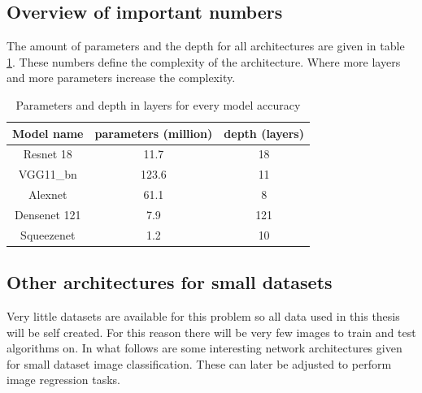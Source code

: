 	\subsection{Overview of important numbers}
	\label{sec:lit:va:overview}
The amount of parameters and the depth for all architectures are given in table \ref{tab:lit:ov:paramdepth}. These numbers define the complexity of the architecture. Where more layers and more parameters increase the complexity.
	\begin{table}[!ht]
	\centering
	\caption{Parameters and depth in layers for every model accuracy}
\begin{tabular}{c | c c}
			Model name		& parameters (million) 		& depth (layers) \\ \hline
			Resnet 18			&	11.7 			&	18 				\\
			VGG11\_bn			&	123.6 			& 11					\\
			Alexnet				&	61.1 			& 8					\\
			Densenet 121	&	7.9 			& 121				\\
			Squeezenet		&	1.2 			& 10
\end{tabular}
\centering

\label{tab:lit:ov:paramdepth}
\end{table}


\subsection{Other architectures for small datasets}
\label{sec:lit:va:un:other}





	Very little datasets are available for this problem so all data used in this thesis will be self created. For this reason there will be very few images to train and test algorithms on. In what follows are some interesting network architectures given for small dataset image classification. These can later be adjusted to perform image regression tasks.
	
